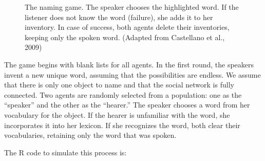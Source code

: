 \documentclass[
  a4paper,
  DIV=11,
  numbers=noendperiod,
  oneside]{scrreprt}
\begin{document}
\begin{figure}


\caption{\label{fig-ch7-img2-old-90}The naming game. The speaker chooses
the highlighted word. If the listener does not know the word (failure),
she adds it to her inventory. In case of success, both agents delete
their inventories, keeping only the spoken word. (Adapted from
Castellano et al., 2009)}

\end{figure}%

The game begins with blank lists for all agents. In the first round, the
speakers invent a new unique word, assuming that the possibilities are
endless. We assume that there is only one object to name and that the
social network is fully connected. Two agents are randomly selected from
a population: one as the ``speaker'' and the other as the ``hearer.''
The speaker chooses a word from her vocabulary for the object. If the
hearer is unfamiliar with the word, she incorporates it into her
lexicon. If she recognizes the word, both clear their vocabularies,
retaining only the word that was spoken.

The R code to simulate this process is:
\end{document}
